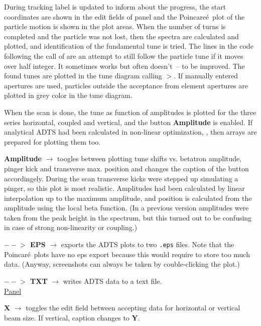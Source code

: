 \documentclass[12pt]{article}
\newcommand\code[1]{{\tt #1}}
\newcommand{\ofld}[1]{\colorbox{black!15}{{{\color{black}\bf #1}}}}
\newcommand\guico[1]{{\color{blue}\code{#1}}}
\newcommand{\unico}[1]{{\color{burntorange}\code{#1}}}
\newcommand{\evcod}[2]{\ofld{#1} $\rightarrow$ \guico{#2}}
\newcommand{\grcod}[2]{\opagui{#1}$>$\guico{#2}}
\newcommand{\opagui}[1]{\colorbox{blue!20}{{\color{black}\code{#1}}}}
\newcommand{\ogui}[1]{\hyperref[#1]{\opagui{#1}}}
\newcommand{\todo}[1]{{\color{red} #1}}
\begin{document}
During tracking label \guico{labtprog} is updated to inform about the progress, the start coordinates are shown in the edit fields of panel \guico{PanCtrl} and the Poincare\'e\ plot of the particle motion is shown in the \guico{psx,psy} plot areas. When the number of turns is completed and the particle was not lost, then the spectra are calculated and plotted, and identification of the fundamental tune is tried. \todo{The lines in the code following the call of \unico{Spectrum} are an attempt to still follow the particle tune if it moves over half integer. It sometimes works but often doesn't~-- to be improved.} The found tunes are plotted in the tune diagram calling \grcod{opatunediag}{AddTushPoint}. If manually entered apertures are used, particles outside the acceptance from element apertures are plotted in grey color in the tune diagram.

When the scan is done, the tune as function of amplitudes is plotted for the three series horizontal, coupled and vertical, and the button \ofld{Amplitude} is enabled. If analytical ADTS had been calculated in non-linear optimization, \ogui{opachroma}, then arrays are prepared for plotting them too.

\evcod{Amplitude}{TSplotButClick} toogles between plotting tune shifts vs. betatron amplitude, pinger kick and transverse max. position and changes the caption of the button accordingely. During the scan transverse kicks were stepped up simulating a pinger, so this plot is most realistic. Amplitudes had been calculated by linear interpolation up to the maximum amplitude, and position is calculated from the amplitude using the local beta function. (In a previous version amplitudes were taken from the peak height in the spectrum, but this turned out to be confusing in case of strong non-linearity or coupling.)

\evcod{$--\!\!>$ EPS}{butExportClick} exports the ADTS plots to two \code{.eps} files. Note that the Poincar\'e\ plots have no eps export because this would require to store too much data. (Anyway, screenshots can always be taken by couble-clicking the plot.)

\evcod{$--\!\!>$ TXT}{butTXTClick}  writes ADTS data to a text file.\\[1ex]

\underline{Panel \guico{PanBeam}}

\evcod{X}{ButBeamXYClick} toggles the edit field between accepting data for horizontal or vertical beam size. If vertical, caption changes to \ofld{Y}. 
\end{document}
